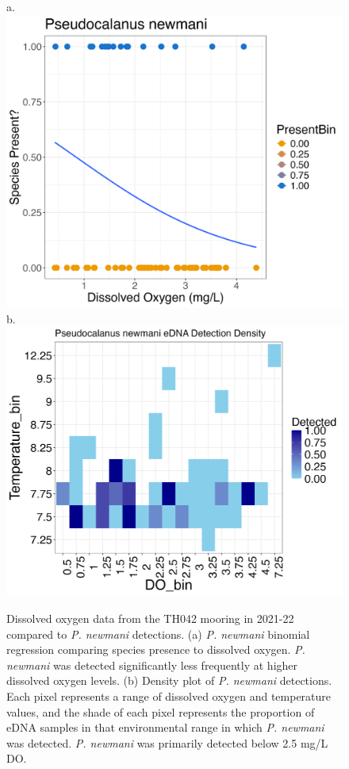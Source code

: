 \documentclass[12pt,twoside]{reedthesis}
\begin{document}
	\begin{figure}[!h]
		\begin{center}
			a. \includegraphics[scale=0.3]{Pnewmani_binom_sig_neg}
			b. \includegraphics[scale=0.3]{Pnewmani_Density} \\
			\caption[\textit{P. newmani} binomial regression and density plot]{\footnotesize{Dissolved oxygen data from the TH042 mooring in 2021-22 compared to \textit{P. newmani} detections. (a) \textit{P. newmani} binomial regression comparing species presence to dissolved oxygen. \textit{P. newmani} was detected significantly less frequently at higher dissolved oxygen levels. (b) Density plot of \textit{P. newmani} detections. Each pixel represents a range of dissolved oxygen and temperature values, and the shade of each pixel represents the proportion of eDNA samples in that environmental range in which \textit{P. newmani} was detected. \textit{P. newmani} was primarily detected below 2.5 mg/L DO.}} %
			\label{PnewmaniBinomDensity}
		\end{center}
	\end{figure} 
	
\end{document}
